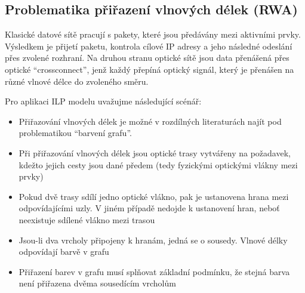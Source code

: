 \subsection{Problematika přiřazení vlnových délek (RWA)}
Klasické datové sítě pracují s pakety, které jsou předávány mezi aktivními prvky. Výsledkem je přijetí paketu, kontrola cílové IP adresy a jeho následné odeslání přes zvolené rozhraní. Na druhou stranu optické sítě jsou data přenášená přes optické \enquote{crossconnect}, jenž každý přepíná optický signál, který je přenášen na různé vlnové délce do zvoleného směru.

Pro aplikaci ILP modelu uvažujme následující scénář:
\begin{itemize}
    \item Přiřazování vlnových délek je možné v rozdílných literaturách najít pod problematikou \enquote{barvení grafu}.
    \item Při přiřazování vlnových délek jsou optické trasy vytvářeny na požadavek, kdežto jejich cesty jsou dané předem (tedy fyzickými optickými vlákny mezi prvky)
    \item Pokud dvě trasy sdílí jedno optické vlákno, pak je ustanovena hrana mezi odpovídajícími uzly. V jiném případě nedojde k ustanovení hran, neboť neexistuje sdílené vlákno mezi trasou
    \item Jsou-li dva vrcholy připojeny k hranám, jedná se o sousedy. Vlnové délky odpovídají barvě v grafu
    \item Přiřazení barev v grafu musí splňovat základní podmínku, že stejná barva není přiřazena dvěma sousedícím vrcholům
\end{itemize}
